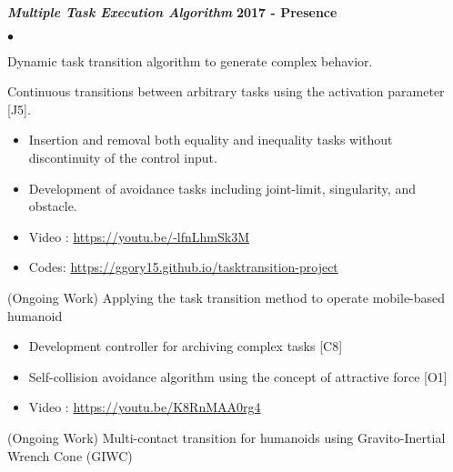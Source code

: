\documentclass[margin,line]{res}
\newenvironment{list2}{
  \begin{list}{$\bullet$}{%
      \setlength{\itemsep}{0in}
      \setlength{\parsep}{0in} \setlength{\parskip}{0in}
      \setlength{\topsep}{0in} \setlength{\partopsep}{0in} 
      \setlength{\leftmargin}{0.2in}}}{\end{list}}
\begin{document}
\begin{resume}
\textbf{\emph { Multiple Task Execution Algorithm}} \hfill  {\bf 2017  - Presence}
\begin{list2}
\item Dynamic task transition algorithm to generate complex behavior.
\item Continuous transitions between arbitrary tasks using the activation parameter [J5].
\begin{itemize}
\vspace*{-.05in}
\item[\checkmark] Insertion and removal both equality and inequality tasks without discontinuity of the control input.
\vspace*{-.05in}
\item[\checkmark] Development of avoidance tasks including joint-limit, singularity, and obstacle.
\vspace*{-.05in}
\item[\checkmark] Video : \url{https://youtu.be/-lfnLhmSk3M}
\vspace*{-.05in}
\item[\checkmark] Codes: \url{https://ggory15.github.io/tasktransition-project}
\vspace*{-.05in}
\end{itemize}
\item (Ongoing Work) Applying the task transition method to operate mobile-based humanoid
\begin{itemize}
\vspace*{-.05in}
\item[\checkmark] Development controller for archiving complex tasks [C8]
\vspace*{-.05in}
\item[\checkmark] Self-collision avoidance algorithm using the concept of attractive force [O1]
\vspace*{-.05in}
\item[\checkmark] Video : \url{https://youtu.be/K8RnMAA0rg4}
\vspace*{-.05in}
\end{itemize}
\item (Ongoing Work) Multi-contact transition for humanoids using Gravito-Inertial Wrench Cone (GIWC)
\end{list2}


\end{resume}
\end{document}
